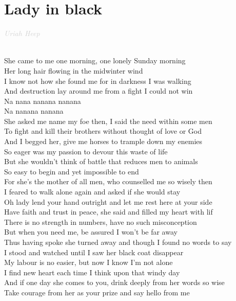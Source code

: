\documentclass[a5paper, 10pt]{book}
\begin{document}
\section{Lady in black}\textcolor{lightgray}{\textit{Uriah Heep}}\\~\\
\begin{minipage}[t]{0.9\textwidth}
  She came to me one morning, one lonely Sunday morning\\
  Her long hair flowing in the midwinter wind\\
  I know not how she found me for in darkness I was walking\\
  And destruction lay around me from a fight I could not win\\

  \hspace*{5mm} Na nana nanana nanana\\
  \hspace*{5mm} Na nanana nanana\\

  She asked me name my foe then, I said the need within some men\\
  To fight and kill their brothers without thought of love or God\\
  And I begged her, give me horses to trample down my enemies\\
  So eager was my passion to devour this waste of life\\

  But she wouldn't think of battle that reduces men to animals\\
  So easy to begin and yet impossible to end\\
  For she's the mother of all men, who counselled me so wisely then\\
  I feared to walk alone again and asked if she would stay\\

  Oh lady lend your hand outright and let me rest here at your side\\
  Have faith and trust in peace, she said and filled my heart with lif\\
  There is no strength in numbers, have no such misconception\\
  But when you need me, be assured I won't be far away\\

  Thus having spoke she turned away and though I found no words to say\\
  I stood and watched until I saw her black coat disappear\\
  My labour is no easier, but now I know I'm not alone\\
  I find new heart each time I think upon that windy day\\

  And if one day she comes to you, drink deeply from her words so wise\\
  Take courage from her as your prize and say hello from me\\
  \\
\end{minipage}
\end{document}
